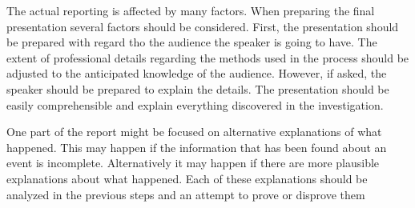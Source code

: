 The actual reporting is affected by many factors. When preparing the final presentation several factors should be considered. First, the presentation should be prepared with regard tho the audience the speaker is going to have. The extent of professional details regarding the methods used in the process should be adjusted to the anticipated knowledge of the audience. However, if asked, the speaker should be prepared to explain the details. The presentation should be easily comprehensible and explain everything discovered in the investigation. 

One part of the report might be focused on alternative explanations of what happened. This may happen if the information that has been found about an event is incomplete. Alternatively it may happen if there are more plausible explanations about what happened. Each of these explanations should be analyzed in the previous steps and an attempt to prove or disprove them







\colorbox{green}{}

